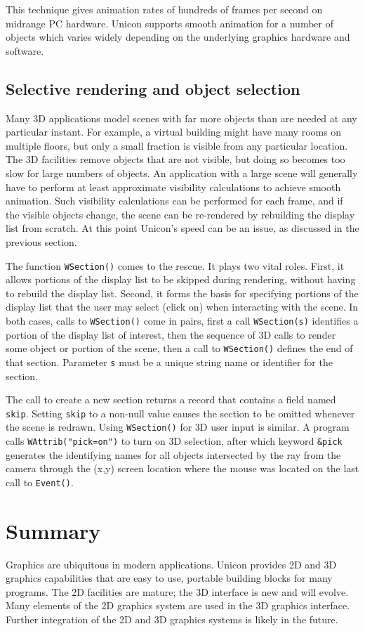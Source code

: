 This technique gives animation rates of hundreds of frames per second
on midrange PC hardware. Unicon supports smooth animation for a number
of objects which varies widely depending on the underlying graphics
hardware and software.

\subsection{Selective rendering and object selection}

Many 3D applications model scenes with far more objects than are
needed at any particular instant. For example, a virtual building
might have many rooms on multiple floors, but only a small fraction is
visible from any particular location. The 3D facilities remove objects
that are not visible, but doing so becomes too slow for large numbers
of objects. An application with a large scene will generally have to
perform at least approximate visibility calculations to achieve smooth
animation. Such visibility calculations can be performed for each
frame, and if the visible objects change, the scene can be re-rendered
by rebuilding the display list from scratch. At this point Unicon's
speed can be an issue, as discussed in the previous section.

The function \texttt{WSection()} comes to the rescue. It plays two
vital roles. First, it allows portions of the display list to be
skipped during rendering, without having to rebuild the display
list. Second, it forms the basis for specifying portions of the
display list that the user may select (click on) when interacting with
the scene. In both cases, calls to \texttt{WSection()} come in pairs,
first a call \texttt{WSection(s)} identifies a portion of the display
list of interest, then the sequence of 3D calls to render some object
or portion of the scene, then a call to \texttt{WSection()} defines
the end of that section. Parameter \texttt{s} must be a unique string
name or identifier for the section.

The call to create a new section returns a record that contains a
field named \texttt{skip}. Setting \texttt{skip} to a non-null value
causes the section to be omitted whenever the scene is redrawn. Using
\texttt{WSection()} for 3D user input is similar. A program calls
\texttt{WAttrib("pick=on")} to turn on 3D selection, after which
keyword \texttt{\&pick} generates the identifying names for all
objects intersected by the ray from the camera through the (x,y)
screen location where the mouse was located on the last call to
\texttt{Event()}.

\section{Summary}

Graphics are ubiquitous in modern applications. Unicon provides 2D and
3D graphics capabilities that are easy to use, portable building
blocks for many programs. The 2D facilities are mature; the 3D
interface is new and will evolve. Many elements of the 2D graphics
system are used in the 3D graphics interface. Further integration of
the 2D and 3D graphics systems is likely in the future.
